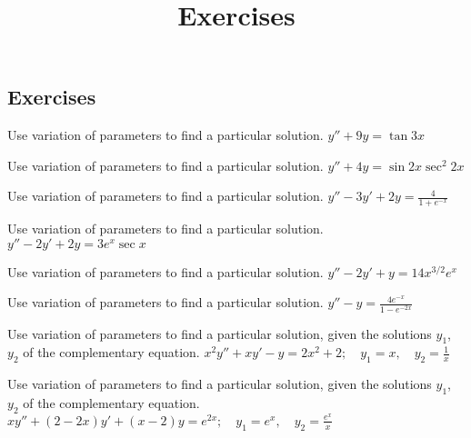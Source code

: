 \documentclass{ximera}
\title{Exercises} \license{CC BY-NC-SA 4.0}
\begin{document}
\begin{abstract}
\end{abstract}
\maketitle

\begin{onlineOnly}
\section*{Exercises}
\end{onlineOnly}


\begin{problem}\label{exer:5.7.1} Use variation of parameters to find a particular solution. $y''+9y=\tan 3x$
\end{problem}

\begin{problem}\label{exer:5.7.2} Use variation of parameters to find a particular solution. $y''+4y=\sin 2x\sec^2 2x$
\end{problem}

\begin{problem}\label{exer:5.7.3}  Use variation of parameters to find a particular solution. $y''-3y'+2y=\frac{4}{1+e^{-x}}$
\end{problem}

\begin{problem}\label{exer:5.7.4} Use variation of parameters to find a particular solution. $y''-2y'+2y=3e^x \sec x$
\end{problem}

\begin{problem}\label{exer:5.7.5} Use variation of parameters to find a particular solution. $y''-2y'+y=14x^{3/2}e^x$
\end{problem}

\begin{problem}\label{exer:5.7.6} Use variation of parameters to find a particular solution. $y''-y=\frac{4e^{-x}}{1-e^{-2x}}$
\end{problem}

\begin{problem}\label{exer:5.7.7}
Use variation
of parameters to find a particular solution, given the solutions
$y_1$, $y_2$ of the complementary equation. $x^2y''+xy'- y=2x^2+2;   \quad y_1=x,
\quad y_2=\frac{1}{x}$
\end{problem}

\begin{problem}\label{exer:5.7.8}
Use variation
of parameters to find a particular solution, given the solutions
$y_1$, $y_2$ of the complementary equation. $xy''+(2-2x)y'+(x-2)y=e^{2x};   \quad y_1=e^x,
\quad y_2=\frac{e^x}{x}$
\end{problem}
\end{document}
